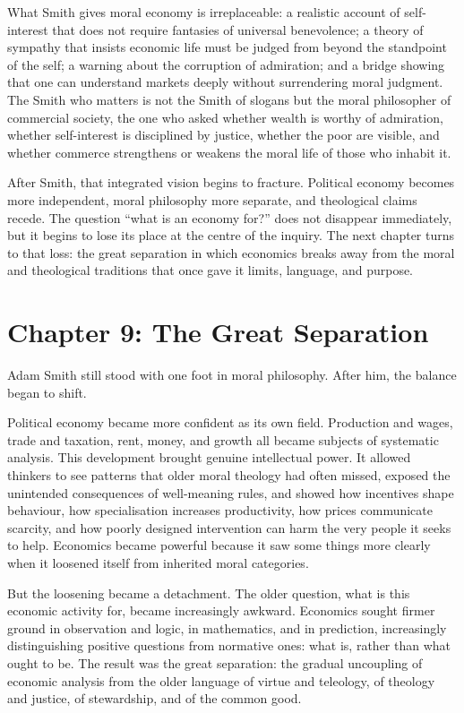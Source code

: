 \documentclass[11pt,a4paper,oneside]{book}
\begin{document}
What Smith gives moral economy is irreplaceable: a realistic account of self-interest that does not require fantasies of universal benevolence; a theory of sympathy that insists economic life must be judged from beyond the standpoint of the self; a warning about the corruption of admiration; and a bridge showing that one can understand markets deeply without surrendering moral judgment. The Smith who matters is not the Smith of slogans but the moral philosopher of commercial society, the one who asked whether wealth is worthy of admiration, whether self-interest is disciplined by justice, whether the poor are visible, and whether commerce strengthens or weakens the moral life of those who inhabit it.

After Smith, that integrated vision begins to fracture. Political economy becomes more independent, moral philosophy more separate, and theological claims recede. The question ``what is an economy for?'' does not disappear immediately, but it begins to lose its place at the centre of the inquiry. The next chapter turns to that loss: the great separation in which economics breaks away from the moral and theological traditions that once gave it limits, language, and purpose.

\chapter*{Chapter 9: The Great Separation}

Adam Smith still stood with one foot in moral philosophy. After him, the balance began to shift.

Political economy became more confident as its own field. Production and wages, trade and taxation, rent, money, and growth all became subjects of systematic analysis. This development brought genuine intellectual power. It allowed thinkers to see patterns that older moral theology had often missed, exposed the unintended consequences of well-meaning rules, and showed how incentives shape behaviour, how specialisation increases productivity, how prices communicate scarcity, and how poorly designed intervention can harm the very people it seeks to help. Economics became powerful because it saw some things more clearly when it loosened itself from inherited moral categories.

But the loosening became a detachment. The older question, what is this economic activity for, became increasingly awkward. Economics sought firmer ground in observation and logic, in mathematics, and in prediction, increasingly distinguishing positive questions from normative ones: what is, rather than what ought to be. The result was the great separation: the gradual uncoupling of economic analysis from the older language of virtue and teleology, of theology and justice, of stewardship, and of the common good.
\end{document}
